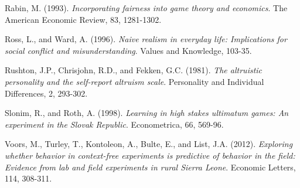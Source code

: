 \documentclass{article}
\begin{document}
\begin{thebibliography}{9}
Rabin, M. (1993).
\textit{Incorporating fairness into game theory and economics}.
The American Economic Review, 83, 1281-1302.

Ross, L., and Ward, A. (1996).
\textit{Naive realism in everyday life: Implications for social conflict and misunderstanding}.
Values and Knowledge, 103-35.

Rushton, J.P., Chrisjohn, R.D., and Fekken, G.C. (1981).
\textit{The altruistic personality and the self-report altruism scale}.
Personality and Individual Differences, 2, 293-302.

Slonim, R., and Roth, A. (1998).
\textit{Learning in high stakes ultimatum games: An experiment in the Slovak Republic}.
Econometrica, 66, 569-96.


Voors, M., Turley, T., Kontoleon, A., Bulte, E., and List, J.A. (2012).
\textit{Exploring whether behavior in context-free experiments is predictive of behavior in the field: Evidence from lab and field experiments in rural Sierra Leone}.
Economic Letters, 114, 308-311.


\end{thebibliography}

	
\end{document}
